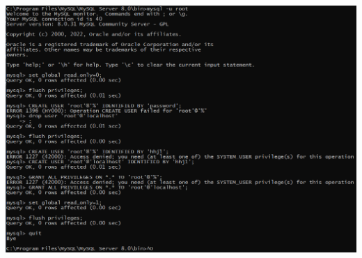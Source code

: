 \documentclass[9pt, b5paper]{article}
\begin{document}
\includegraphics[width=.9\linewidth]{./pic/readme_20230111_162732.png}
\end{document}
